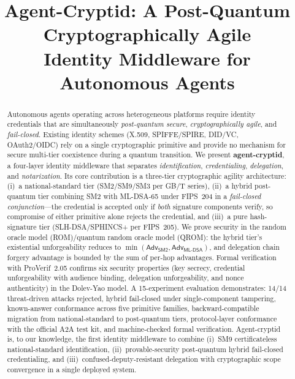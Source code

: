 \documentclass[10pt,twocolumn]{IEEEtran}
\title{Agent-Cryptid: A Post-Quantum Cryptographically Agile\\Identity Middleware for Autonomous Agents}
\author{
  \IEEEauthorblockN{Haibo Yi\IEEEauthormark{1}}
  \IEEEauthorblockA{\IEEEauthorrefmark{1}College of Artificial Intelligence,\\
    Shenzhen Polytechnic University\\
    Shenzhen, China\\
    Email: haiboyi@szpu.edu.cn}
  \IEEEauthorblockN{Corresponding Author: Haibo Yi\IEEEauthormark{1}}
}
\begin{document}
\maketitle

\begin{abstract}
Autonomous agents operating across heterogeneous platforms require identity
credentials that are simultaneously \emph{post-quantum secure},
\emph{cryptographically agile}, and \emph{fail-closed}. Existing identity
schemes (X.509, SPIFFE/SPIRE, DID/VC, OAuth2/OIDC) rely on a single
cryptographic primitive and provide no mechanism for secure multi-tier
coexistence during a quantum transition. We present
\textbf{agent-cryptid}, a four-layer identity middleware that separates
\emph{identification}, \emph{credentialing}, \emph{delegation}, and
\emph{notarization}. Its core contribution is a three-tier cryptographic
agility architecture: (i)~a national-standard tier (SM2/SM9/SM3 per GB/T
series), (ii)~a hybrid post-quantum tier combining SM2 with ML-DSA-65 under
FIPS~204 in a \emph{fail-closed conjunction}---the credential is accepted
only if \emph{both} signature components verify, so compromise of either
primitive alone rejects the credential, and (iii)~a pure hash-signature
tier (SLH-DSA/SPHINCS+ per FIPS~205). We prove security in the random
oracle model (ROM)/quantum random oracle model (QROM): the hybrid tier's
existential unforgeability reduces to
$\min(\mathsf{Adv}_{\mathsf{SM2}},\mathsf{Adv}_{\mathsf{ML\text{-}DSA}})$,
and delegation chain forgery advantage is bounded by the sum of per-hop
advantages. Formal verification with ProVerif~2.05 confirms six security
properties (key secrecy, credential unforgeability with audience binding,
delegation unforgeability, and nonce authenticity) in the Dolev-Yao model.
A 15-experiment evaluation demonstrates: 14/14 threat-driven
attacks rejected, hybrid fail-closed under single-component tampering,
known-answer conformance across five primitive families, backward-compatible
migration from national-standard to post-quantum tiers, protocol-layer
conformance with the official A2A test kit, and machine-checked formal
verification.
Agent-cryptid is, to our knowledge, the first identity middleware to
combine (i)~SM9 certificateless national-standard identification,
(ii)~provable-security post-quantum hybrid fail-closed credentialing,
and (iii)~confused-deputy-resistant delegation with cryptographic scope
convergence in a single deployed system.
\end{abstract}
\end{document}
